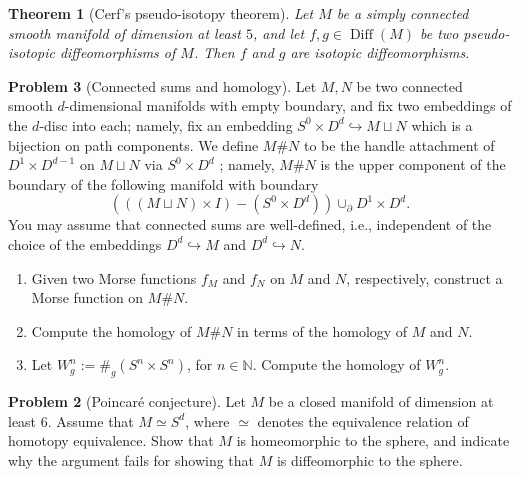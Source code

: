 \documentclass[reqno]{amsart}
\newtheorem{theorem}{Theorem}[section]
\theoremstyle{definition}
\newtheorem{problem}[theorem]{Problem}
\theoremstyle{remark}
\DeclareMathOperator{\Diff}{Diff}
\begin{document}
   \begin{theorem}[Cerf's pseudo-isotopy theorem]
       Let $M$ be a simply connected smooth
       manifold of dimension at least $5$, and
       let $f,g \in \Diff (M)$ be two pseudo-isotopic
       diffeomorphisms of $M$. Then
       $f$ and $g$ are isotopic diffeomorphisms.
   \end{theorem}


   \begin{problem}[Connected sums and homology]
       Let $M, N$ be two connected smooth
       $d$-dimensional manifolds with empty
       boundary, and fix two embeddings
       of the $d$-disc into each; namely, fix
       an embedding $S^{0} \times D^{d} \hookrightarrow
       M \sqcup N$ which is a bijection on path
       components. We define
       $M \# N$ to be the handle attachment of $D^{1}\times 
       D^{d-1}$ on $M \sqcup N$ via 
       $S^{0} \times D^{d}$ ; namely, $M \# N$ is the upper
       component of the boundary of the following manifold
       with boundary
       \[
           \left( \left( \left( M \sqcup N \right) \times I
           \right) - \left( S^{0} \times D^{d} \right) \right) 
           \cup_{\partial } D^{1} \times D^{d}.
       \] 
       You may assume that connected sums are well-defined,
       i.e., independent of the choice of the embeddings
       $D^{d} \hookrightarrow M$ and
       $D^{d} \hookrightarrow N$.

       \begin{enumerate}
           \item Given two Morse functions $f_M$ and
               $f_N$ on $M$ and $N$, respectively, construct a
               Morse function on $M \# N$.
           \item Compute the homology of
               $M \# N$ in terms of the homology
               of $M$ and $N$.
           \item Let $W_g^{n} :=
               \#_g \left( S^{n} \times S^{n} \right) $,
               for $n \in \mathbb{N} $. Compute the
               homology of $W_g^{n}$.
       \end{enumerate}

\begin{problem}[Poincaré conjecture]
           Let $M$ be a closed manifold of dimension at
           least $6$. Assume that
           $M \simeq S^{d}$, where
           $\simeq$ denotes the equivalence relation
           of homotopy equivalence. Show that
           $M$ is homeomorphic to the sphere, and indicate
           why the argument fails for showing that
           $M$ is diffeomorphic to the sphere.
\end{problem}


\end{problem}
\end{document}
